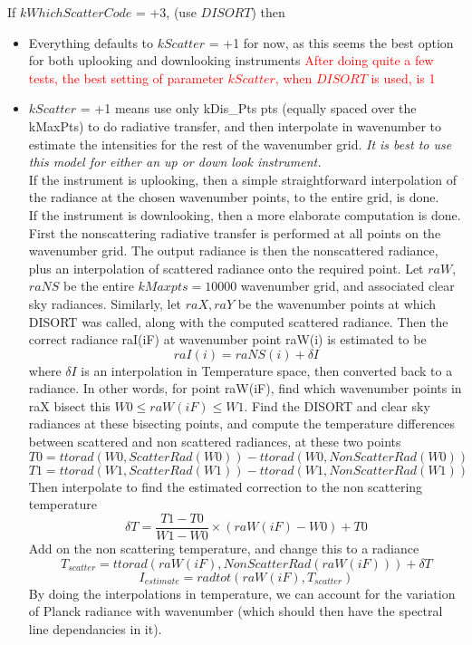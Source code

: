 \documentclass[12pt]{article}
\begin{document}
{{\noindent If $kWhichScatterCode$ = +3, (use $DISORT$) then 
\begin{itemize}
\item Everything defaults to $kScatter$ = +1 for now, as this seems the best
option for both uplooking and downlooking instruments
\textcolor{red}
{After doing quite a few tests, the best setting of parameter $kScatter$, when 
$DISORT$ is used, is 1}

\item $kScatter$ = +1 means use only kDis\_Pts pts (equally spaced over the 
kMaxPts) to do radiative transfer, and then interpolate in wavenumber to 
estimate the intensities for the rest of the wavenumber grid.  {\em It is 
best to use this model for either an up or down look instrument.} \\

If the instrument is uplooking, then a simple straightforward interpolation
of the radiance at the chosen wavenumber points, to the entire grid, is done.\\

If the instrument is downlooking, then a more elaborate computation is done. 
First the nonscattering radiative transfer is performed at all points on 
the wavenumber grid. The output radiance is then the nonscattered radiance, 
plus an interpolation of scattered radiance onto the required point. 
Let $raW$,$raNS$ be the entire $kMaxpts=10000$ wavenumber grid, and associated
clear sky radiances. Similarly, let $raX,raY$ be the wavenumber points at which
DISORT was called, along with the computed scattered radiance. Then the 
correct radiance raI(iF) at wavenumber point raW(i) is estimated to be
\[
raI(i) = raNS(i) + \delta I
\]
where $\delta I$ is an interpolation in Temperature space, then converted 
back to a radiance. In other words, for point raW(iF), find which wavenumber
points in raX bisect this  $W0 \le raW(iF) \le W1$. Find the DISORT and clear 
sky radiances at these bisecting points, and compute the temperature
differences between scattered and non scattered radiances, at these two points
\[
T0 = ttorad(W0,ScatterRad(W0)) -  ttorad(W0,NonScatterRad(W0)) 
\]
\[
T1 = ttorad(W1,ScatterRad(W1)) -  ttorad(W1,NonScatterRad(W1))
\]
Then interpolate to find the estimated correction to the non scattering 
temperature
\[
\delta T = \frac{T1-T0}{W1-W0} \times (raW(iF) - W0) + T0
\]
Add on the non scattering temperature, and change this to a radiance
\[
T_{scatter} = ttorad(raW(iF),NonScatterRad(raW(iF))) + \delta T
\]
\[
I_{estimate} = radtot(raW(iF),T_{scatter})
\]
By doing the interpolations in temperature, we can account for the variation
of Planck radiance with wavenumber (which should then have the spectral line 
dependancies in it).


\end{itemize}}}
\end{document}
